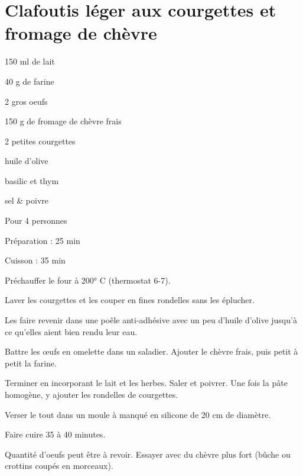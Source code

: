 \section[\normalsize{Clafoutis l\'eger aux courgettes et fromage de ch\`evre}]{Clafoutis l\'eger aux courgettes et fromage de ch\`evre}

\begin{ingredients}
\item 150 ml de lait
\item 40 g de farine
\item 2 gros oeufs
\item 150 g de fromage de ch\`evre frais
\item 2 petites courgettes
\item huile d'olive 
\item basilic et thym
\item sel \& poivre 
\end{ingredients}
\begin{infos}
\item Pour 4 personnes
\item Préparation : 25 min
\item Cuisson : 35 min
\end{infos}
\begin{etapes}
\item Pr\'echauffer le four \`a 200° C (thermostat 6-7).
\item Laver les courgettes et les couper en fines rondelles sans les \'eplucher.
\item Les faire revenir dans une po\^ele anti-adh\'esive avec un peu d'huile d'olive jusqu'\`a ce qu'elles aient bien rendu leur eau.
\item Battre les œufs en omelette dans un saladier. Ajouter le ch\`evre frais, puis petit \`a petit la farine.
\item Terminer en incorporant le lait et les herbes. Saler et poivrer. Une fois la p\^ate homog\`ene, y ajouter les rondelles de courgettes.
\item Verser le tout dans un moule \`a manqu\'e en silicone de 20 cm de diam\`etre.
\item Faire cuire 35 \`a 40 minutes. 
\end{etapes}
\begin{conseils}
Quantit\'e d'oeufs peut \^etre \`a revoir.
Essayer avec du ch\`evre plus fort (bûche ou crottins coup\'es en morceaux).
\end{conseils}
